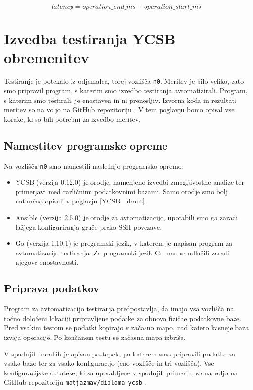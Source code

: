 \documentclass[a4paper, 12pt]{book}
\begin{document}
\begin{equation} \label{eq:latency}
latency = operation\_end\_ms - operation\_start\_ms
\end{equation}

\section{Izvedba testiranja YCSB obremenitev}
\label{YCSB_benchmarking_steps}
Testiranje je potekalo iz odjemalca, torej vozlišča \texttt{n0}. Meritev je bilo veliko, zato smo pripravil program, s katerim smo izvedbo testiranja avtomatizirali. Program, s katerim smo testirali, je enostaven in ni prenosljiv. Izvorna koda in rezultati meritev so na voljo na GitHub repozitoriju \cite{matjazmav/diploma-ycsb}. V tem poglavju bomo opisal vse korake, ki so bili potrebni za izvedbo meritev.

\subsection{Namestitev programske opreme}
Na vozlišču \texttt{n0} smo namestili naslednjo programsko opremo:
\begin{itemize}
    \item YCSB (verzija 0.12.0) \cite{brianfrankcooper/YCSB} je orodje, namenjeno izvedbi zmogljivostne analize ter primerjavi med različnimi podatkovnimi bazami. Samo orodje smo bolj natančno opisali v poglavju \ref{YCSB_about}.
    \item Ansible (verzija 2.5.0) \cite{Ansible} je orodje za avtomatizacijo, uporabili smo ga zaradi lažjega konfiguriranja gruče preko SSH povezave.
    \item Go (verzija 1.10.1) \cite{Golang} je programski jezik, v katerem je napisan program za avtomatizacijo testiranja. Za programski jezik Go smo se odločili zaradi njegove enostavnosti.
\end{itemize} 

\subsection{Priprava podatkov}
\label{benchmarking-prepare-data}
Program za avtomatizacijo testiranja predpostavlja, da imajo vsa vozlišča na točno določeni lokaciji pripravljene podatke za obnovo fizične podatkovne baze. Pred vsakim testom se podatki kopirajo v začasno mapo, nad katero kasneje baza izvaja operacije. Po končanem testu se začasna mapa izbriše.

V spodnjih korakih je opisan postopek, po katerem smo pripravili podatke za vsako bazo ter za vsako konfiguracijo (eno vozlišče in tri vozlišča). Vse konfiguracijske datoteke, ki so uporabljene v spodnjih primerih, so na voljo na GitHub repozitoriju \texttt{matjazmav/diploma-ycsb} \cite{matjazmav/diploma-ycsb}.
\end{document}
